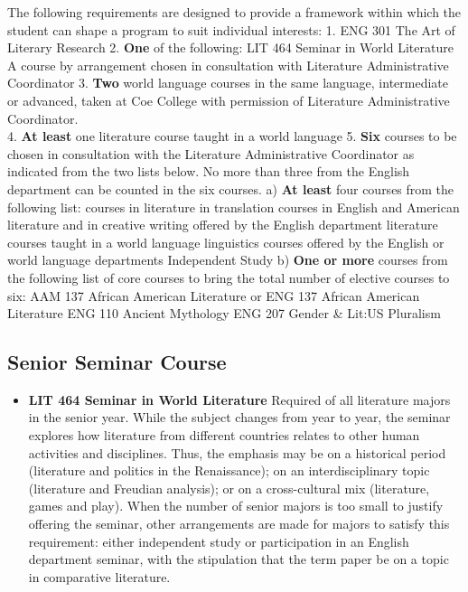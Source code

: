 \documentclass[
  letterpaper,
]{scrbook}
\providecommand{\tightlist}{%
  \setlength{\itemsep}{0pt}\setlength{\parskip}{0pt}}
\begin{document}
The following requirements are designed to provide a framework within
which the student can shape a program to suit individual interests: 1.
ENG 301 The Art of Literary Research 2. \textbf{One} of the following:
LIT 464 Seminar in World Literature A course by arrangement chosen in
consultation with Literature Administrative Coordinator 3. \textbf{Two}
world language courses in the same language, intermediate or advanced,
taken at Coe College with permission of Literature Administrative
Coordinator.\\
4. \textbf{At least} one literature course taught in a world language 5.
\textbf{Six} courses to be chosen in consultation with the Literature
Administrative Coordinator as indicated from the two lists below. No
more than three from the English department can be counted in the six
courses. a) \textbf{At least} four courses from the following list:
courses in literature in translation courses in English and American
literature and in creative writing offered by the English department
literature courses taught in a world language linguistics courses
offered by the English or world language departments Independent Study
b) \textbf{One or more} courses from the following list of core courses
to bring the total number of elective courses to six: AAM 137 African
American Literature or ENG 137 African American Literature ENG 110
Ancient Mythology ENG 207 Gender \& Lit:US Pluralism

\hypertarget{senior-seminar-course}{%
\subsection{Senior Seminar Course}\label{senior-seminar-course}}

\begin{itemize}
\tightlist
\item
  \textbf{LIT 464 Seminar in World Literature} Required of all
  literature majors in the senior year. While the subject changes from
  year to year, the seminar explores how literature from different
  countries relates to other human activities and disciplines. Thus, the
  emphasis may be on a historical period (literature and politics in the
  Renaissance); on an interdisciplinary topic (literature and Freudian
  analysis); or on a cross-cultural mix (literature, games and play).
  When the number of senior majors is too small to justify offering the
  seminar, other arrangements are made for majors to satisfy this
  requirement: either independent study or participation in an English
  department seminar, with the stipulation that the term paper be on a
  topic in comparative literature.
\end{itemize}
\end{document}
